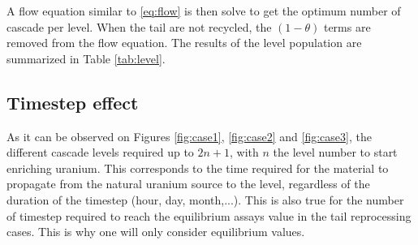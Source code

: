 A flow equation similar to \eqref{eq:flow} is then solve to get the optimum
number of cascade per level. When the tail are not recycled, the $(1-\theta)$
terms are removed from the flow equation.  The results of the level population
are summarized in Table \ref{tab:level}.

\subsection{Timestep effect}

As it can be observed on Figures \ref{fig:case1}, \ref{fig:case2} and
\ref{fig:case3}, the different cascade levels required up to $2n+1$, with $n$ the
level number to start enriching uranium. This corresponds to the time required
for the material to propagate from the natural uranium source to the level,
regardless of the duration of the timestep (hour, day, month,...). This is also
true for the number of timestep required to reach the equilibrium assays value in
the tail reprocessing cases. This is why one will only consider equilibrium
values.
